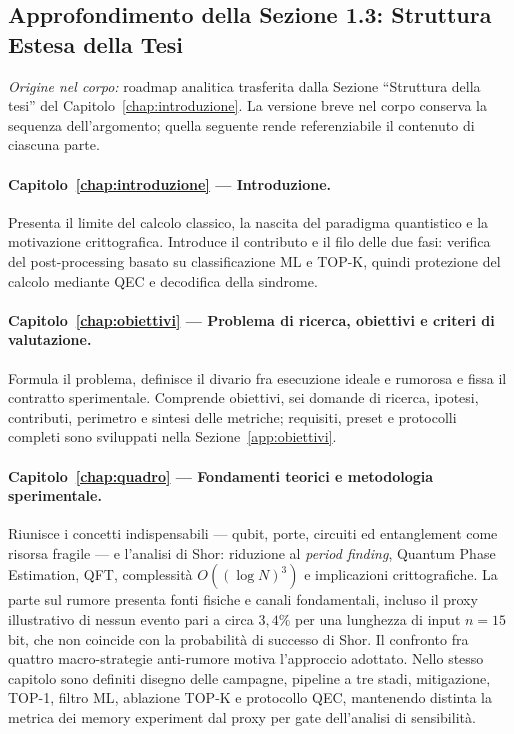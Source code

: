 \begin{onehalfspace}
\subsection{Approfondimento della Sezione 1.3: Struttura Estesa della Tesi}
\label{app:intro:struttura}

\noindent\textit{Origine nel corpo:} roadmap analitica trasferita dalla Sezione ``Struttura della tesi'' del Capitolo~\ref{chap:introduzione}. La versione breve nel corpo conserva la sequenza dell'argomento; quella seguente rende referenziabile il contenuto di ciascuna parte.

\paragraph{Capitolo~\ref{chap:introduzione} --- Introduzione.}
Presenta il limite del calcolo classico, la nascita del paradigma quantistico e la motivazione crittografica. Introduce il contributo e il filo delle due fasi: verifica del post-processing basato su classificazione \ac{ML} e TOP-K, quindi protezione del calcolo mediante \ac{QEC} e decodifica della sindrome.

\paragraph{Capitolo~\ref{chap:obiettivi} --- Problema di ricerca, obiettivi e criteri di valutazione.}
Formula il problema, definisce il divario fra esecuzione ideale e rumorosa e fissa il contratto sperimentale. Comprende obiettivi, sei domande di ricerca, ipotesi, contributi, perimetro e sintesi delle metriche; requisiti, preset e protocolli completi sono sviluppati nella Sezione~\ref{app:obiettivi}.

\paragraph{Capitolo~\ref{chap:quadro} --- Fondamenti teorici e metodologia sperimentale.}
Riunisce i concetti indispensabili --- qubit, porte, circuiti ed entanglement come risorsa fragile --- e l'analisi di Shor: riduzione al \textit{period finding}, Quantum Phase Estimation, \ac{QFT}, complessità $O((\log N)^3)$ e implicazioni crittografiche. La parte sul rumore presenta fonti fisiche e canali fondamentali, incluso il proxy illustrativo di nessun evento pari a circa $3{,}4\%$ per una lunghezza di input $n=15$ bit, che non coincide con la probabilità di successo di Shor. Il confronto fra quattro macro-strategie anti-rumore motiva l'approccio adottato. Nello stesso capitolo sono definiti disegno delle campagne, pipeline a tre stadi, mitigazione, TOP-1, filtro \ac{ML}, ablazione TOP-K e protocollo \ac{QEC}, mantenendo distinta la metrica dei memory experiment dal proxy per gate dell'analisi di sensibilità.


\end{onehalfspace}

